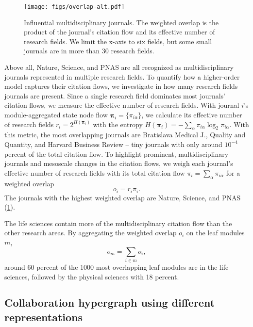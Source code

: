 \documentclass[aps,rmp,floats,floatfix,twocolumn,superscriptaddress,final]{revtex4-2}
\begin{document}
\begin{figure}[H]
    \centering
    \texttt{[image: figs/overlap-alt.pdf]}
    \caption{Influential multidisciplinary journals. The weighted overlap is the product of the journal's citation flow and its effective number of research fields. We limit the x-axis to six fields, but some small journals are in more than 30 research fields.}
    \label{fig:weighted-overlap}
\end{figure}
%
Above all, Nature, Science, and PNAS are all recognized as multidisciplinary journals represented in multiple research fields.
To quantify how a higher-order model captures their citation flows, we investigate in how many research fields journals are present.
Since a single research field dominates most journals' citation flows, we measure the effective number of research fields.
With journal $i$'s module-aggregated state node flow $\pmb{\pi}_i = \{ \pi_{i\alpha} \}$, we calculate its effective number of research fields $r_i = 2^{H(\pmb{\pi}_i)}$ with the entropy $H(\pmb{\pi}_i) = - \sum_\alpha \pi_{i\alpha} \log_2 \pi_{i\alpha}$.
%
%
With this metric, the most overlapping journals are Bratislava Medical J., Quality and Quantity, and Harvard Business Review -- tiny journals with only around $10^{-4}$ percent of the total citation flow.
To highlight prominent, multidisciplinary journals and mesoscale changes in the citation flows, we weigh each journal's effective number of research fields with its total citation flow $\pi_i = \sum_\alpha \pi_{i\alpha}$ for a weighted overlap
%
\begin{equation}
    o_i = r_i \pi_i.
\end{equation}
%
The journals with the highest weighted overlap are Nature, Science, and PNAS (\cref{fig:weighted-overlap}).


The life sciences contain more of the multidisciplinary citation flow than the other research areas.
By aggregating the weighted overlap $o_i$ on the leaf modules $m$,
%
\begin{equation}
    o_m = \sum_{i \in m} o_i,
\end{equation}
%
around 60 percent of the 1000 most overlapping leaf modules are in the life sciences, followed by the physical sciences with 18 percent.


\subsection*{Collaboration hypergraph using different representations}
\end{document}
